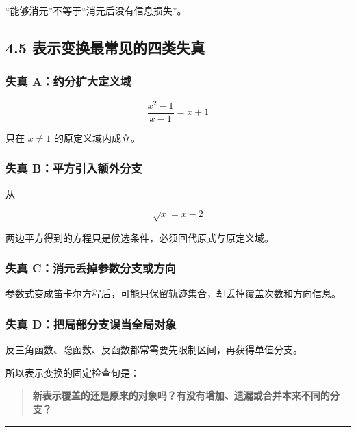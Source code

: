 \documentclass[11pt,a4paper]{ctexart}
\begin{document}
``能够消元''不等于``消元后没有信息损失''。

\subsection{4.5
表示变换最常见的四类失真}\label{ux8868ux793aux53d8ux6362ux6700ux5e38ux89c1ux7684ux56dbux7c7bux5931ux771f}

\subsubsection{失真
A：约分扩大定义域}\label{ux5931ux771f-aux7ea6ux5206ux6269ux5927ux5b9aux4e49ux57df}

\[
\frac{x^2-1}{x-1}=x+1
\]

只在 \(x\ne1\) 的原定义域内成立。

\subsubsection{失真
B：平方引入额外分支}\label{ux5931ux771f-bux5e73ux65b9ux5f15ux5165ux989dux5916ux5206ux652f}

从

\[
\sqrt{x}=x-2
\]

两边平方得到的方程只是候选条件，必须回代原式与原定义域。

\subsubsection{失真
C：消元丢掉参数分支或方向}\label{ux5931ux771f-cux6d88ux5143ux4e22ux6389ux53c2ux6570ux5206ux652fux6216ux65b9ux5411}

参数式变成笛卡尔方程后，可能只保留轨迹集合，却丢掉覆盖次数和方向信息。

\subsubsection{失真
D：把局部分支误当全局对象}\label{ux5931ux771f-dux628aux5c40ux90e8ux5206ux652fux8befux5f53ux5168ux5c40ux5bf9ux8c61}

反三角函数、隐函数、反函数都常需要先限制区间，再获得单值分支。

所以表示变换的固定检查句是：

\begin{quote}
\textbf{新表示覆盖的还是原来的对象吗？有没有增加、遗漏或合并本来不同的分支？}
\end{quote}

\begin{center}\rule{0.5\linewidth}{0.5pt}\end{center}
\end{document}
